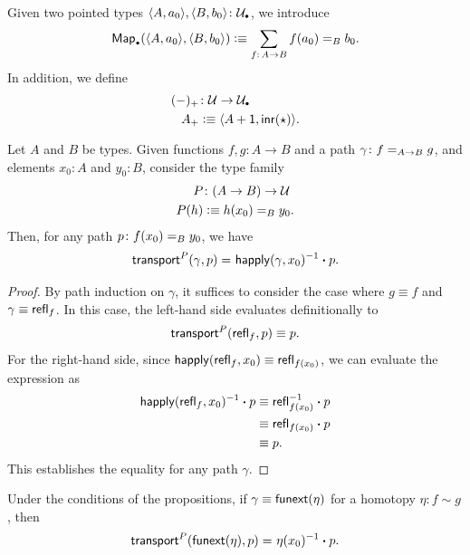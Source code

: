 \begin{defn}\label{defn:pointed-maps}
    Given two pointed types $\dep{A,a_0},\dep{B,b_0}\colon\puniv$, we introduce
    \[
        \fun{Map}_\sbull(\dep{A,a_0},\dep{B,b_0})
            \defeq\sum_{f\colon A\to B}f(a_0)\eq Bb_0.
    \]
    In addition, we define
    \begin{align*}
        (\dummy)_+&\colon\univ\to\puniv\\
        A_+&\defeq\dep{A+\fun1,\fun{inr}(\fstar)}.
    \end{align*}
\end{defn}

\begin{prop}\label{prop:transport-funext-eq}
    Let\/ $A$ and\/ $B$ be types. Given functions\/ $f,g\colon A\to B$ and a path\/ $\gamma\colon f\eq{A\to B}g$, and elements\/ $x_0\colon A$ and\/ $y_0\colon B$, consider the type family
    \begin{align*}
        P&\colon(A\to B)\to\univ\\
        P(h)&\defeq h(x_0)\eq{B}y_0.
    \end{align*}
    Then, for any path\/ $p\colon f(x_0)\eq{B}y_0$, we have
    \[
        \mathsf{transport}^P(\gamma,p)\mathrel{=_{}}\mathsf{happly}(\gamma,x_0)^{-1}\mathbin{\boldsymbol{\cdot}} p.
    \]
\end{prop}

\begin{proof}
    By path induction on $\gamma$, it suffices to consider the case where $g\equiv f$ and $\gamma\equiv\mathsf{refl}_f$. In this case, the left-hand side evaluates definitionally to
    \[
        \mathsf{transport}^P(\mathsf{refl}_f,p) \equiv p.
    \]
    For the right-hand side, since $\mathsf{happly}(\mathsf{refl}_f,x_0)\equiv\mathsf{refl}_{f(x_0)}$, we can evaluate the expression as
    \begin{align*}
        \mathsf{happly}(\mathsf{refl}_f,x_0)^{-1} \mathbin{\boldsymbol{\cdot}} p
            &\equiv \mathsf{refl}_{f(x_0)}^{-1} \mathbin{\boldsymbol{\cdot}} p\\
            &\equiv \mathsf{refl}_{f(x_0)} \mathbin{\boldsymbol{\cdot}} p\\
            &\equiv p.
    \end{align*}
    This establishes the equality for any path $\gamma$.
\end{proof}

\begin{cor}\label{cor:transport-funext-eq}
    Under the conditions of the propositions, if $\gamma\equiv\mathsf{funext}(\eta)$ for a homotopy $\eta\colon f\sim g$, then
    \[
        \mathsf{transport}^P(\mathsf{funext}(\eta),p)
            \mathrel{=_{}}\eta(x_0)^{-1}\mathbin{\boldsymbol{\cdot}} p.
    \]
\end{cor}

